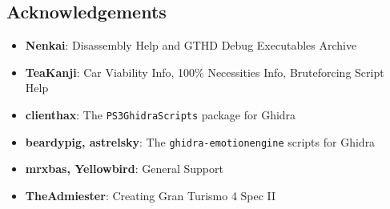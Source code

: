 \documentclass[14pt,a4paper,notitlepage]{extarticle}
\begin{document}
        \subsection*{Acknowledgements}
            \small{
                \begin{itemize}
                    \item \textbf{Nenkai}: Disassembly Help and GTHD Debug Executables Archive
                    \item \textbf{TeaKanji}: Car Viability Info, 100\% Necessities Info,
                    Bruteforcing Script Help
                    \item \textbf{clienthax}: The \texttt{PS3GhidraScripts} package for Ghidra
                    \item \textbf{beardypig, astrelsky}: The \texttt{ghidra-emotionengine} scripts
                    for Ghidra
                    \item \textbf{mrxbas, Yellowbird}: General Support
                    \item \textbf{TheAdmiester}: Creating Gran Turismo 4 Spec II
                \end{itemize}
            }
\end{document}
